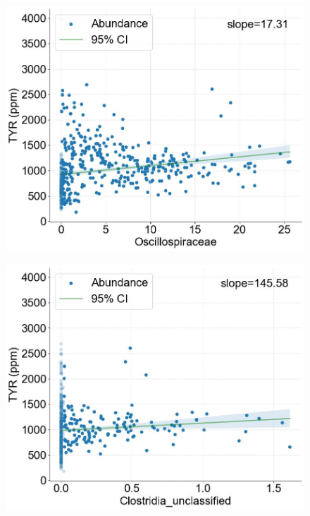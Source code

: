 \documentclass[12pt]{article}
\begin{document}
\begin{figure}[H]
    \centering
    \begin{minipage}{0.48\linewidth}
        \centering
        \includegraphics[width=\linewidth, height=0.8\linewidth]{pic/family/family1.jpg}
               \label{fig:image1}
    \end{minipage}
    \hfill
    \begin{minipage}{0.48\linewidth}
        \centering
        \includegraphics[width=\linewidth, height=0.8\linewidth]{pic/family/family2.jpg}
        \label{fig:fig:image2}
    \end{minipage}
    

\end{figure}
\end{document}
